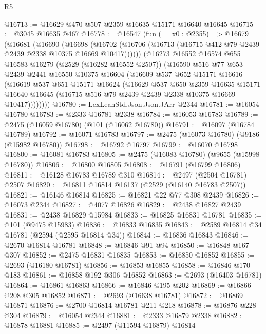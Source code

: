 \begin{lexlean}{R5}
\begin{coremodule}
@16713 := @16629 @470 @507 @2359 @16635 @15171 @16640 @16645
@16715 := @3045 @16635 @467
@16778 := @16547
    (fun (__x0 : @2355) =>
    @16679
      (@16681
        (@16690
          (@16698
            (@16702 (@16706 (@16713 (@16715 @412 @79 @2439 @2439 @2338 @10375 @16669 @10417))))))
        (@16273
          @16552
          @16574
          @655
          @16583
          @16279
          (@2529 (@16282 @16552 @2507))
          (@16590
            @516
            @77
            @653
            @2439
            @2441
            @16550
            @10375
            @16604
            (@16609
              @537
              @652
              @15171
              @16616
              (@16619
                @537
                @651
                @15171
                @16624
                (@16629
                  @537
                  @650
                  @2359
                  @16635
                  @15171
                  @16640
                  @16645
                  (@16715 @516 @79 @2439 @2439 @2338 @10375 @16669 @10417))))))))
@16780 := LexLeanStd.Json.Json.JArr @2344
@16781 := @16054 @16780
@16783 := @2333 @16781 @2338
@16784 := @16053 @16783
@16789 := @2475 (@16059 @16780) (@101 (@16062 @16780))
@16791 := @16097 (@16784 @16789)
@16792 := @16071 @16783
@16797 := @2475 (@16073 @16780) (@9186 (@15982 @16780))
@16798 := @16792 @16797
@16799 := @16070 @16798
@16800 := @16081 @16783
@16805 := @2475 (@16083 @16780) (@9655 (@15998 @16780))
@16806 := @16800 @16805
@16808 := @16791 (@16799 @16806)
@16811 := @16128 @16783 @16789 @310
@16814 := @2497 (@2504 @16781) @2507
@16820 := @16811 @16814 @16137 (@2529 (@16140 @16783 @2507))
@16821 := @16146 @16814
@16825 := @16821 @22 @77 @308 @2439
@16826 := @16073 @2344
@16827 := @4077 @16826
@16829 := @2438 @16827 @2439
@16831 := @2438 @16829 @15984
@16833 := @16825 @16831 @16781
@16835 := @101 (@9475 @15983)
@16836 := @16833 @16835
@16843 := @2589 @16814 @34 @16781 (@2594 (@2595 @16814 @34))
@16844 := @16836 @16843
@16846 := @2670 @16814 @16781
@16848 := @16846 @91 @94
@16850 := @16848 @167 @307
@16852 := @2475 @16831 @16835
@16853 := @16850 @16852
@16855 := @2693 (@16180 @16781)
@16856 := @16853 @16855
@16858 := @16846 @170 @183
@16861 := @16858 @192 @306 @16852
@16863 := @2693 (@16403 @16781)
@16864 := @16861 @16863
@16866 := @16846 @195 @202
@16869 := @16866 @208 @305 @16852
@16871 := @2693 (@16638 @16781)
@16872 := @16869 @16871
@16876 := @2700 @16814 @16781 @211 @218
@16878 := @16876 @228 @304
@16879 := @16054 @2344
@16881 := @2333 @16879 @2338
@16882 := @16878 @16881
@16885 := @2497 (@11594 @16879) @16814

\end{coremodule}
\end{lexlean}
